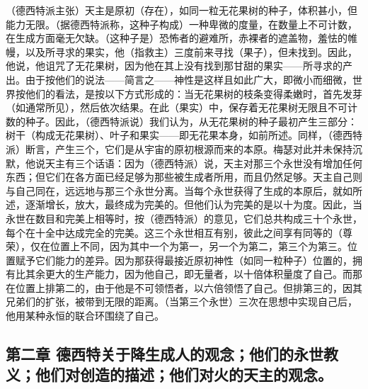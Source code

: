 （德西特派主张）天主是原初（存在），如同一粒无花果树的种子，体积甚小，但能力无限。（据德西特派称，这种子构成）一种卑微的度量，在数量上不可计数，在生成方面毫无欠缺。（这种子是）恐怖者的避难所，赤裸者的遮盖物，羞怯的帷幔，以及所寻求的果实，他（指救主）三度前来寻找（果子），但未找到。因此，他说，他诅咒了无花果树，因为他在其上没有找到那甘甜的果实——所寻求的产出。由于按他们的说法——简言之——神性是这样且如此广大，即微小而细微，世界按他们的看法，是按以下方式形成的：当无花果树的枝条变得柔嫩时，首先发芽（如通常所见），然后依次结果。在此（果实）中，保存着无花果树无限且不可计数的种子。因此，（德西特派说）我们认为，从无花果树的种子最初产生三部分：树干（构成无花果树）、叶子和果实——即无花果本身，如前所述。同样，（德西特派）断言，产生三个，它们是从宇宙的原初根源而来的本原。梅瑟对此并未保持沉默，他说天主有三个话语：因为（德西特派）说，天主对那三个永世没有增加任何东西；但它们在各方面已经足够为那些被生成者所用，而且仍然足够。天主自己则与自己同在，远远地与那三个永世分离。当每个永世获得了生成的本原后，就如所述，逐渐增长，放大，最终成为完美的。但他们认为完美的是以十为度。因此，当永世在数目和完美上相等时，按（德西特派）的意见，它们总共构成三十个永世，每个在十全中达成完全的完美。这三个永世相互有别，彼此之间享有同等的（尊荣），仅在位置上不同，因为其中一个为第一，另一个为第二，第三个为第三。位置赋予它们能力的差异。因为那获得最接近原初神性（如同一粒种子）位置的，拥有比其余更大的生产能力，因为他自己，即无量者，以十倍体积量度了自己。而那在位置上排第二的，由于他是不可领悟者，以六倍领悟了自己。但排第三的，因其兄弟们的扩张，被带到无限的距离。（当第三个永世）三次在思想中实现自己后，他用某种永恒的联合环围绕了自己。\par


\subsection{第二章 德西特关于降生成人的观念；他们的永世教义；他们对创造的描述；他们对火的天主的观念。}

